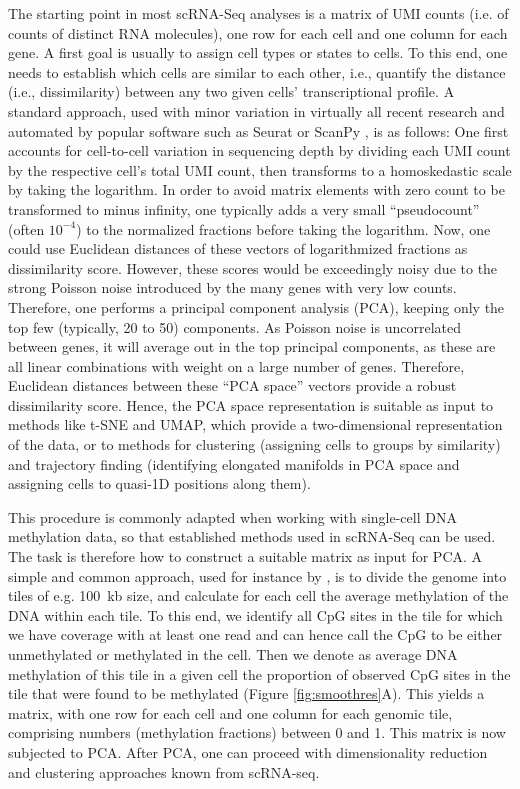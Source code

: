 \documentclass[twocolumn,10pt]{article}
\begin{document}
The starting point in most scRNA-Seq analyses is a matrix of UMI counts (i.e.
of counts of distinct RNA molecules), one row for each cell and one column for each gene.
A first goal is usually to assign cell types or states to cells.
To this end, one needs to establish which cells are similar to each other, i.e., quantify the distance (i.e., dissimilarity) between any two given cells' transcriptional profile.
A standard approach, used with minor variation in virtually all recent research and automated by popular software such as Seurat \citep{Hao_2021} or ScanPy \citep{Wolf_2018}, is as follows: One first accounts for cell-to-cell variation in sequencing depth by dividing each UMI count by the respective cell's total UMI count, then transforms to a homoskedastic scale by taking the logarithm.
In order to avoid matrix elements with zero count to be transformed to minus infinity, one typically adds a very small ``pseudocount'' (often $10^{-4}$) to the normalized fractions before taking the logarithm.
Now, one could use Euclidean distances of these vectors of logarithmized fractions as dissimilarity score.
However, these scores would be exceedingly noisy due to the strong Poisson noise introduced by the many genes with very low counts.
Therefore, one performs a principal component analysis (PCA), keeping only the top few (typically, 20 to 50) components.
As Poisson noise is uncorrelated between genes, it will average out in the top principal components, as these are all linear combinations with weight on a large number of genes.
Therefore, Euclidean distances between these ``PCA space'' vectors provide a robust dissimilarity score.
Hence, the PCA space representation is suitable as input to methods like t-SNE and UMAP, which provide a two-dimensional representation of the data, or to methods for clustering (assigning cells to groups by similarity) and trajectory finding (identifying elongated manifolds in PCA space and assigning cells to quasi-1D positions along them).

This procedure is commonly adapted when working with single-cell DNA methylation data, so that established methods used in scRNA-Seq can be used.
The task is therefore how to construct a suitable matrix as input for PCA.
A simple and common approach, used for instance by \citet{luo2017single}, is to divide the genome into tiles of e.g. 100~kb size, and calculate for each cell the average methylation of the DNA within each tile.
To this end, we identify all CpG sites in the tile for which we have coverage with at least one read and can hence call the CpG to be either unmethylated or methylated in the cell.
Then we denote as average DNA methylation of this tile in a given cell the proportion of observed CpG sites in the tile that were found to be methylated (Figure \ref{fig:smoothres}A).
This yields a matrix, with one row for each cell and one column for each genomic tile, comprising numbers (methylation fractions) between 0 and 1.
This matrix is now subjected to PCA.
After PCA, one can proceed with dimensionality reduction and clustering approaches known from scRNA-seq.
\end{document}
